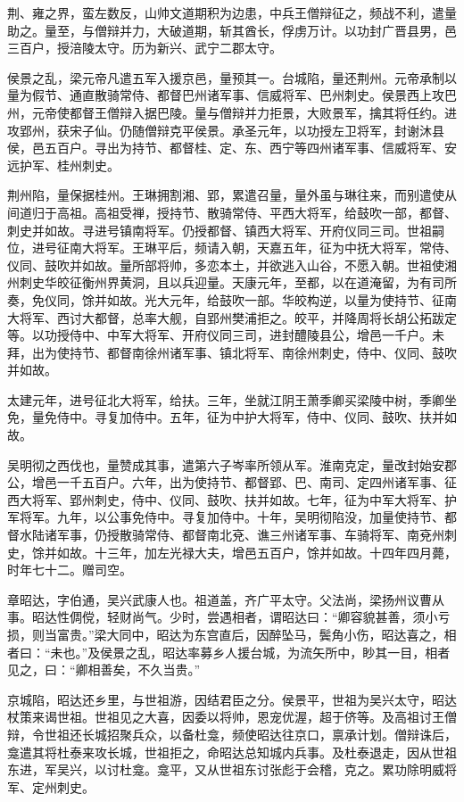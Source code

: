 \documentclass[]{article}
\begin{document}
荆、雍之界，蛮左数反，山帅文道期积为边患，中兵王僧辩征之，频战不利，遣量助之。量至，与僧辩并力，大破道期，斩其酋长，俘虏万计。以功封广晋县男，邑三百户，授涪陵太守。历为新兴、武宁二郡太守。

侯景之乱，梁元帝凡遣五军入援京邑，量预其一。台城陷，量还荆州。元帝承制以量为假节、通直散骑常侍、都督巴州诸军事、信威将军、巴州刺史。侯景西上攻巴州，元帝使都督王僧辩入据巴陵。量与僧辩并力拒景，大败景军，擒其将任约。进攻郢州，获宋子仙。仍随僧辩克平侯景。承圣元年，以功授左卫将军，封谢沐县侯，邑五百户。寻出为持节、都督桂、定、东、西宁等四州诸军事、信威将军、安远护军、桂州刺史。

荆州陷，量保据桂州。王琳拥割湘、郢，累遣召量，量外虽与琳往来，而别遣使从间道归于高祖。高祖受禅，授持节、散骑常侍、平西大将军，给鼓吹一部，都督、刺史并如故。寻进号镇南将军。仍授都督、镇西大将军、开府仪同三司。世祖嗣位，进号征南大将军。王琳平后，频请入朝，天嘉五年，征为中抚大将军，常侍、仪同、鼓吹并如故。量所部将帅，多恋本土，并欲逃入山谷，不愿入朝。世祖使湘州刺史华皎征衡州界黄洞，且以兵迎量。天康元年，至都，以在道淹留，为有司所奏，免仪同，馀并如故。光大元年，给鼓吹一部。华皎构逆，以量为使持节、征南大将军、西讨大都督，总率大舰，自郢州樊浦拒之。皎平，并降周将长胡公拓跋定等。以功授侍中、中军大将军、开府仪同三司，进封醴陵县公，增邑一千户。未拜，出为使持节、都督南徐州诸军事、镇北将军、南徐州刺史，侍中、仪同、鼓吹并如故。

太建元年，进号征北大将军，给扶。三年，坐就江阴王萧季卿买梁陵中树，季卿坐免，量免侍中。寻复加侍中。五年，征为中护大将军，侍中、仪同、鼓吹、扶并如故。

吴明彻之西伐也，量赞成其事，遣第六子岑率所领从军。淮南克定，量改封始安郡公，增邑一千五百户。六年，出为使持节、都督郢、巴、南司、定四州诸军事、征西大将军、郢州刺史，侍中、仪同、鼓吹、扶并如故。七年，征为中军大将军、护军将军。九年，以公事免侍中。寻复加侍中。十年，吴明彻陷没，加量使持节、都督水陆诸军事，仍授散骑常侍、都督南北兗、谯三州诸军事、车骑将军、南兗州刺史，馀并如故。十三年，加左光禄大夫，增邑五百户，馀并如故。十四年四月薨，时年七十二。赠司空。

章昭达，字伯通，吴兴武康人也。祖道盖，齐广平太守。父法尚，梁扬州议曹从事。昭达性倜傥，轻财尚气。少时，尝遇相者，谓昭达曰：``卿容貌甚善，须小亏损，则当富贵。''梁大同中，昭达为东宫直后，因醉坠马，鬓角小伤，昭达喜之，相者曰：``未也。''及侯景之乱，昭达率募乡人援台城，为流矢所中，眇其一目，相者见之，曰：``卿相善矣，不久当贵。''

京城陷，昭达还乡里，与世祖游，因结君臣之分。侯景平，世祖为吴兴太守，昭达杖策来谒世祖。世祖见之大喜，因委以将帅，恩宠优渥，超于侪等。及高祖讨王僧辩，令世祖还长城招聚兵众，以备杜龛，频使昭达往京口，禀承计划。僧辩诛后，龛遣其将杜泰来攻长城，世祖拒之，命昭达总知城内兵事。及杜泰退走，因从世祖东进，军吴兴，以讨杜龛。龛平，又从世祖东讨张彪于会稽，克之。累功除明威将军、定州刺史。
\end{document}
